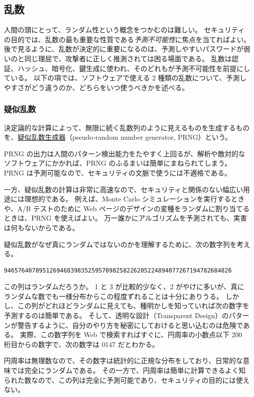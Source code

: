 \documentclass[uplatex]{jsarticle}
\def\label#1{}%
\begin{document}
\subsection{乱数}\label{subsec:ch5-random}

人間の頭にとって、ランダム性という概念をつかむのは難しい。
セキュリティの目的では、乱数の最も重要な性質である\emph{予測不可能性}に焦点を当てればよい。
後で見るように、乱数が決定的に重要になるのは、予測しやすいパスワードが弱いのと同じ理屈で、攻撃者に正しく推測されては困る場面である。
乱数は認証、ハッシュ、暗号化、鍵生成に使われ、そのどれもが予測不可能性を前提にしている。
以下の項では、ソフトウェアで使える 2 種類の乱数について、予測しやすさがどう違うのか、どちらをいつ使うべきかを述べる。

\subsubsection{疑似乱数}

\begin{dfn}[疑似乱数生成器]\label{dfn:ch5-prng}
決定論的な計算によって、無限に続く乱数列のように見えるものを生成するものを、\underline{疑似乱数生成器}（pseudo-random number generator, PRNG）という。
\end{dfn}

PRNG の出力は人間のパターン検出能力をたやすく上回るが、解析や敵対的なソフトウェアにかかれば、PRNG のふるまいは簡単にまねられてしまう。
PRNG は予測可能なので、セキュリティの文脈で使うには不適格である。

一方、疑似乱数の計算は非常に高速なので、セキュリティと関係のない幅広い用途には理想的である。
例えば、Monte Carlo シミュレーションを実行するときや、A/B テストのために Web ページのデザインの変種をランダムに割り当てるときは、PRNG を使えばよい。
万一誰かにアルゴリズムを予測されても、実害は何もないからである。

\begin{exa}[円周率の数字列]\label{exa:ch5-pi-digits}
疑似乱数がなぜ真にランダムではないのかを理解するために、次の数字列を考える。
\begin{verbatim}
94657640789512694683983525957098258226205224894077267194782684826
\end{verbatim}
この列はランダムだろうか。
1 と 3 が比較的少なく、2 がやけに多いが、真にランダムな数でも一様分布からこの程度ずれることは十分にありうる。
しかし、この列がどれほどランダムに見えても、種明かしを知っていれば次の数字を予測するのは簡単である。
そして、透明な設計（Transparent Design）のパターンが警告するように、自分のやり方を秘密にしておけると思い込むのは危険である。
実際、この数字列を Web で検索すればすぐに、円周率の小数点以下 200 桁目からの数字で、次の数字は 0147 だとわかる。

円周率は無理数なので、その数字は統計的に正規な分布をしており、日常的な意味では完全にランダムである。
その一方で、円周率は簡単に計算できるよく知られた数なので、この列は完全に予測可能であり、セキュリティの目的には使えない。
\end{exa}
\end{document}
